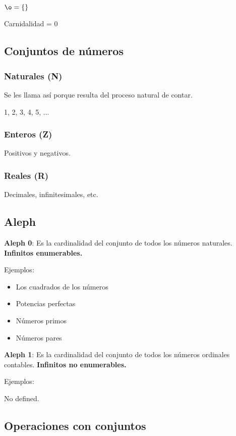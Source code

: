 \documentclass{article}
\begin{document}
$\o = \{\}$

Carnidalidad = 0

\subsection{Conjuntos de números}

\subsubsection{Naturales (N)}

Se les llama así porque resulta del proceso natural de contar.

1, 2, 3, 4, 5, ...

\subsubsection{Enteros (Z)}

Positivos y negativos.

\subsubsection{Reales (R)}

Decimales, infinitesimales, etc.

\subsection{Aleph}

\textbf{Aleph 0}:
Es la cardinalidad del conjunto de todos los números naturales.
\textbf{Infinitos enumerables.}
\vspace{1em}

Ejemplos:
\begin{itemize}
	\item
	Los cuadrados de los números
	\item
	Potencias perfectas
	\item
	Números primos
	\item
	Números pares
\end{itemize}

\textbf{Aleph 1}: Es la cardinalidad del conjunto de todos los números
ordinales contables. \textbf{Infinitos no enumerables.}
\vspace{1em}

Ejemplos:
\vspace{1em}

No defined.

\subsection{Operaciones con conjuntos}
\end{document}
